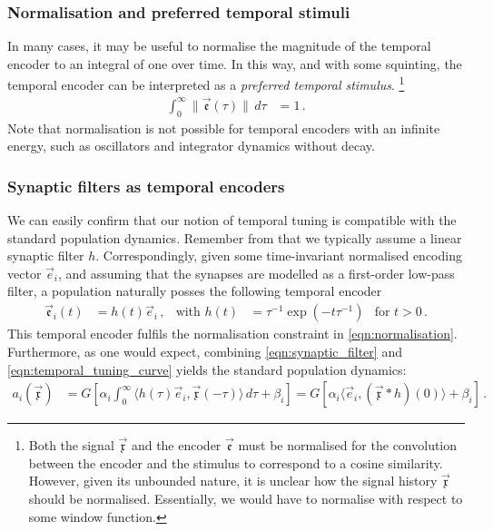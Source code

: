 \subsubsection{Normalisation and preferred temporal stimuli}
In many cases, it may be useful to normalise the magnitude of the temporal encoder to an integral of one over time.
In this way, and with some squinting, the temporal encoder can be interpreted as a \emph{preferred temporal stimulus}.%
\footnote{Both the signal $\vec{\mathfrak{x}}$ and the encoder $\vec{\mathfrak{e}}$ must be normalised for the convolution between the encoder and the stimulus to correspond to a cosine similarity.
However, given its unbounded nature, it is unclear how the signal history $\vec{\mathfrak{x}}$ should be normalised.
Essentially, we would have to normalise with respect to some window function.}
\begin{align}
	\int_{0}^\infty \| \vec{\mathfrak{e}}(\tau) \| \,\mathit{d\tau}&= 1 \,.
	\label{eqn:normalisation}
\end{align}
Note that normalisation is not possible for temporal encoders with an infinite energy, such as oscillators and integrator dynamics without decay.

\subsubsection{Synaptic filters as temporal encoders}
We can easily confirm that our notion of temporal tuning is compatible with the standard \NEF population dynamics.
Remember from  that we typically assume a linear synaptic filter $h$.
Correspondingly, given some time-invariant normalised encoding vector $\vec e_i$, and assuming that the synapses are modelled as a first-order low-pass filter, a population naturally posses the following temporal encoder
\begin{align}
	\vec{\mathfrak{e}}_i(t)
		&= h(t) \vec e_i \,, & \text{with } h(t) &= \tau^{-1} \exp(-t \tau^{-1}) & \text{for } t > 0 \,.
	\label{eqn:synaptic_filter}
\end{align}
This temporal encoder fulfils the normalisation constraint in \cref{eqn:normalisation}.
Furthermore, as one would expect, combining \cref{eqn:synaptic_filter} and \cref{eqn:temporal_tuning_curve} yields the standard \NEF population dynamics:
\begin{align}
	a_i(\vec{\mathfrak{x}})
		&= G\left[ \alpha_i \! \int_{0}^\infty \!\!\! \big\langle h(\tau) \vec{e}_i, \vec{\mathfrak{x}}(-\tau) \big\rangle \,\mathit{d\tau} + \beta_i \right]
		 = G\left[ \alpha_i \big\langle \vec e_i, (\vec{\mathfrak{x}} \ast h)(0) \big\rangle + \beta_i \right] \,.
	\label{eqn:synaptic_filter_tuning_curve}
\end{align}

